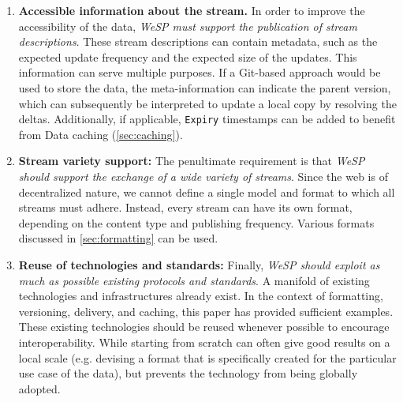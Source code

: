 \begin{enumerate}
    \item \textbf{Accessible information about the stream.} In order to improve the accessibility of the data, \emph{WeSP must support the publication of stream descriptions}. These stream descriptions can contain metadata, such as the expected update frequency and the expected size of the updates. This information can serve multiple purposes. If a Git-based approach would be used to store the data, the meta-information can indicate the parent version, which can subsequently be interpreted to update a local copy by resolving the deltas. Additionally, if applicable, \texttt{Expiry} timestamps can be added to benefit from Data caching (\cref{sec:caching}).
    
    \item \textbf{Stream variety support:} The penultimate requirement is that \emph{WeSP should support the exchange of a wide variety of streams}. Since the web is of decentralized nature, we cannot define a single model and format to which all streams must adhere. Instead, every stream can have its own format, depending on the content type and publishing frequency. Various formats discussed in \cref{sec:formatting} can be used.
    
    \item \textbf{Reuse of technologies and standards:} Finally, \emph{WeSP should exploit as much as possible existing protocols and standards}. A manifold of existing technologies and infrastructures already exist. In the context of formatting, versioning, delivery, and caching, this paper has provided sufficient examples. These existing technologies should be reused whenever possible to encourage interoperability. While starting from scratch can often give good results on a local scale (e.g. devising a format that is specifically created for the particular use case of the data), but prevents the technology from being globally adopted.
\end{enumerate}